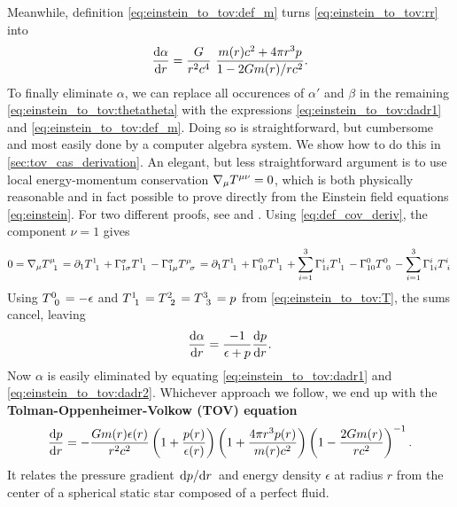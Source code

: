 Meanwhile, definition \eqref{eq:einstein_to_tov:def_m} turns \cref{eq:einstein_to_tov:rr} into
\begin{equation}
	\odv{\alpha}{r} = \frac{G}{r^2 c^4} \frac{m(r) c^2 + 4 \pi r^3 p}{1 - 2 G m(r) / r c^2} .
	\label{eq:einstein_to_tov:dadr1}
\end{equation}
To finally eliminate $\alpha$, we can replace all occurences of $\alpha'$ and $\beta$ in the remaining \cref{eq:einstein_to_tov:thetatheta} with the expressions \eqref{eq:einstein_to_tov:dadr1} and \eqref{eq:einstein_to_tov:def_m}.
Doing so is straightforward, but cumbersome and most easily done by a computer algebra system.
We show how to do this in \cref{sec:tov_cas_derivation}.
An elegant, but less straightforward argument is to use local energy-momentum conservation $\nabla_\mu T\indices{^\mu^\nu} = 0$, which is both physically reasonable and in fact possible to prove directly from the Einstein field equations \eqref{eq:einstein}.
For two different proofs, see \cite{ref:einstein_conservation_energy_momentum} and \cite[section 8.3.2]{ref:mika_gr_notes}.
Using \cref{eq:def_cov_deriv}, the component $\nu=1$ gives
\begin{equation*}
	0
	= \nabla_\mu T\indices{^\mu_1}
	= \partial_1 T\indices{^1_1} + \Gamma^\sigma_{1 \sigma} T\indices{^1_1} - \Gamma^\sigma_{1 \mu} T\indices{^\mu_\sigma}
	= \partial_1 T\indices{^1_1} + \Gamma^0_{10} T\indices{^1_1} + \sum_{i=1}^3 \Gamma^i_{1i} T\indices{^1_1} - \Gamma^0_{10} T\indices{^0_0} - \sum_{i=1}^3 \Gamma^i_{1i} T\indices{^i_i}
\end{equation*}
Using $T\indices{^0_0} = -\epsilon$ and $T\indices{^1_1} = T\indices{^2_2} = T\indices{^3_3} = p$ from \cref{eq:einstein_to_tov:T}, the sums cancel, leaving
\begin{equation}
	\odv{\alpha}{r} = \frac{-1}{\epsilon+p} \odv{p}{r} .
	\label{eq:einstein_to_tov:dadr2}
\end{equation}
Now $\alpha$ is easily eliminated by equating \eqref{eq:einstein_to_tov:dadr1} and \eqref{eq:einstein_to_tov:dadr2}. 
Whichever approach we follow, we end up with the \textbf{Tolman-Oppenheimer-Volkow (TOV) equation}
\begin{equation}
	\odv{p}{r} = -\frac{G m(r) \epsilon(r)}{r^2 c^2} \left( 1 + \frac{p(r)}{\epsilon(r)} \right) \left( 1 + \frac{4 \pi r^3 p(r)}{m(r) c^2} \right) \left( 1 - \frac{2 G m(r)}{r c^2} \right)^{-1} .
	\label{eq:tov}
\end{equation}
It relates the pressure gradient $\odv{p}/{r}$ and energy density $\epsilon$ at radius $r$ from the center of a spherical static star composed of a perfect fluid.
